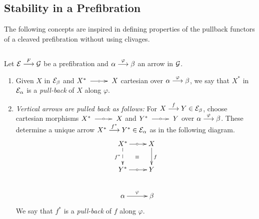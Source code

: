 \subsection{Stability in a Prefibration}

The following concepts are inspired in defining properties of the pullback functors of a cleaved prefibration without using clivages.

\begin{sinnadastandard}
\label{pbk1} $ $

Let $\mathcal{E} \overset {F} {\longrightarrow} \mathcal{G}$ be a prefibration and 
$\alpha \overset {\varphi} {\longrightarrow} \beta$ an arrow in $\mathcal{G}$.

\begin{enumerate} 

\item 
%
%
%
%
Given $X$ in $\mathcal{E}_\beta$ and ${X^* \tocar X }$ cartesian over 
$\alpha \overset {\varphi} {\longrightarrow} \beta$, we say that $X^*$ in $\mathcal{E}_\alpha$ is a \emph{pull-back} of $X$ along $\varphi$.

 
\item \label{vpull} 
\emph{Vertical arrows are pulled back as follows:} For ${X \overset {f} {\longrightarrow} Y \in \mathcal{E}_\beta}$, choose cartesian morphisms ${X^* \tocar X}$ and 
 ${Y^* \tocar Y}$ over $\alpha \overset {\varphi} {\longrightarrow} \beta$. These determine a unique arrow ${X^* \overset {f^*} {\longrightarrow} Y^* \in\mathcal{E}_\alpha}$ as in the following diagram.
$$
\xymatrix
   {
    X^* \ar[r]|\car
        \ar@{-->}[d]_{f^*} 
  & X \ar[d]^{f} 
  \\
    Y^* \ar[r]|\car 
  & Y \ar@{}[ul]|\equiv  
  \\
    \alpha \ar[r]^{\varphi} 
  & \beta
   }
$$
We say that $f^*$ is a \emph{pull-back} of $f$ along $\varphi$.

\vspace{1ex}

\begin{comment}
{\bf 3.}  By uniqueness it follows that the pull-back of a composition is the composition of the pull-backs.
 For $X \mr{f} Y \mr{g}$, $(g f)^* = g^* f^*$. In a diagram:
$$
\xymatrix
   {
  & {}
    X^* \ar[r] 
        \ar@{-->}[d]_{f^*}
        \ar@/_2pc/[drdl]_{(g f) ^*} 
  & X \ar[d]^{f}
      \ar@/^2pc/[drdl]^{g f} 
  \\
    {} \ar@{}[r]|{\hspace{2ex}\equiv}
  & Y^* \ar[r] 
        \ar@{-->}[d]_{g^*}  
  & Y \ar@{}[ul]|\equiv
      \ar[d]^{g}
      \ar@{}[r]|{\hspace{-1.75ex}\equiv} 
  & {}
  \\ 
  & {} 
    Z^* \ar[r]  
  & Z \ar@{}[ul]|\equiv  
  \\
  & {}
    \alpha \ar[r]^{\varphi} 
  & \beta
   }
$$
\end{comment}


\end{enumerate}
\end{sinnadastandard}
